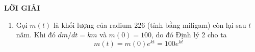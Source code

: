 \vspace{0.6em}
\noindent\textbf{\textsf{\color{stewartcyan}LỜI GIẢI}}
\begin{enumerate}[label=\textsf{\textbf{(\alph*)}}, leftmargin=2em, itemsep=1.5pt, parsep=0pt, topsep=2pt]
  \item Gọi $m(t)$ là khối lượng của radium-226 (tính bằng miligam) còn lại sau $t$ năm. Khi đó $dm/dt = km$ và $m(0) = 100$, do đó Định lý 2 cho ta
  \[
  m(t) = m(0)e^{kt} = 100e^{kt}
  \]
\end{enumerate}
